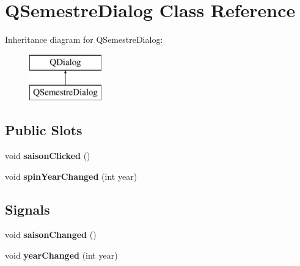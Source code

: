 \hypertarget{classQSemestreDialog}{\section{Q\+Semestre\+Dialog Class Reference}
\label{classQSemestreDialog}
}
Inheritance diagram for Q\+Semestre\+Dialog\+:\begin{figure}[H]
\begin{center}
\leavevmode
\includegraphics[height=2.000000cm]{classQSemestreDialog}
\end{center}
\end{figure}
\subsection*{Public Slots}
\begin{DoxyCompactItemize}
\item 
\hypertarget{classQSemestreDialog_adaa121f00dc58b7fab93db3bad686b91}{void {\bfseries saison\+Clicked} ()}\label{classQSemestreDialog_adaa121f00dc58b7fab93db3bad686b91}

\item 
\hypertarget{classQSemestreDialog_a6a4c1e728db14181a9d105f423bc2f9e}{void {\bfseries spin\+Year\+Changed} (int year)}\label{classQSemestreDialog_a6a4c1e728db14181a9d105f423bc2f9e}

\end{DoxyCompactItemize}
\subsection*{Signals}
\begin{DoxyCompactItemize}
\item 
\hypertarget{classQSemestreDialog_aa65d57ae77e7e30eb21efdf9e62a26af}{void {\bfseries saison\+Changed} ()}\label{classQSemestreDialog_aa65d57ae77e7e30eb21efdf9e62a26af}

\item 
\hypertarget{classQSemestreDialog_a7d86c777e09a67ffc48b98366be8d2b1}{void {\bfseries year\+Changed} (int year)}\label{classQSemestreDialog_a7d86c777e09a67ffc48b98366be8d2b1}

\end{DoxyCompactItemize}
